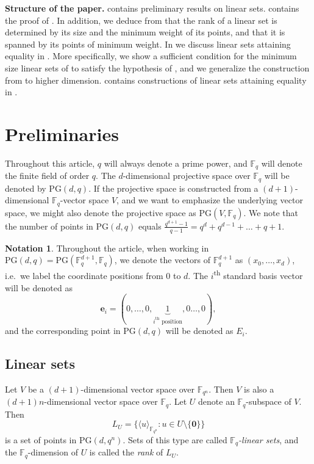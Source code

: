 \documentclass[11pt]{article}
\theoremstyle{definition}
\newtheorem{notation}[theorem]{Notation}
\newcommand{\fqn}{\mathbb{F}_{q^n}}
\newcommand{\fq}{{\mathbb F}_{q}}
\newcommand{\PG}{\mathrm{PG}}
\newcommand{\e}{\mathbf e}
\begin{document}
\textbf{Structure of the paper.}
 contains preliminary results on linear sets.
 contains the proof of .
In addition, we deduce from  that the rank of a linear set is determined by its size and the minimum weight of its points, and that it is spanned by its points of minimum weight.
In  we discuss linear sets attaining equality in .
More specifically, we show a sufficient condition for the minimum size linear sets of \cite{Jena2021onlinearsets} to satisfy the hypothesis of , and we generalize the construction from \cite{napolitano2022classification} to higher dimension.
 contains constructions of linear sets attaining equality in .




\section{Preliminaries}
 \label{sec:Preliminaries}

Throughout this article, $q$ will always denote a prime power, and $\fq$ will denote the finite field of order $q$.
The $d$-dimensional projective space over $\fq$ will be denoted by $\PG(d,q)$.
If the projective space is constructed from a $(d+1)$-dimensional $\fq$-vector space $V$, and we want to emphasize the underlying vector space, we might also denote the projective space as $\PG(V,\fq)$.
We note that the number of points in $\PG(d,q)$ equals $\frac{q^{d+1}-1}{q-1} = q^d + q^{d-1} + \ldots + q + 1$.

\begin{notation}
 Throughout the article, when working in $\PG(d,q) = \PG(\fq^{d+1},\fq)$, we denote the vectors of $\fq^{d+1}$ as $(x_0, \dots, x_{d})$, i.e.\ we label the coordinate positions from 0 to $d$.
 The $i$\textsuperscript{th} standard basis vector will be denoted as
 \[
  \e_i = (0, \dots, 0, \underbrace 1 _{i^\text{th} \text{ position}}, 0 \dots, 0),
 \]
 and the corresponding point in $\PG(d,q)$ will be denoted as $E_i$.
\end{notation}

\subsection{Linear sets}

Let $V$ be a $(d+1)$-dimensional vector space over $\fqn$.
Then $V$ is also a $(d+1)n$-dimensional vector space over $\fq$.
Let $U$ denote an $\fq$-subspace of $V$.
Then
\[
 L_U=\{\langle u \rangle_{\fqn} \colon u\in U\setminus\{\mathbf{0}\}\}
\]
is a set of points in $\PG(d,q^n)$.
Sets of this type are called \emph{$\fq$-linear sets}, and the $\fq$-dimension of $U$ is called the \emph{rank} of $L_U$.
\end{document}
